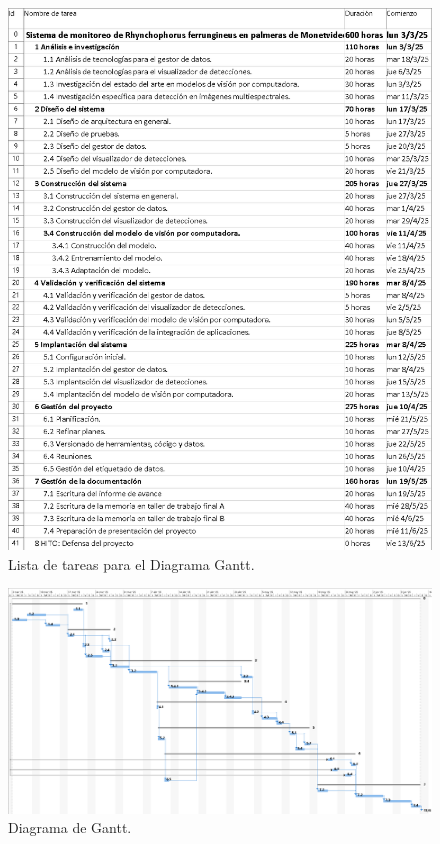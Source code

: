 \documentclass[
11pt, %
]{charter}
\begin{document}
\begin{figure}[htpb]
  \centering
  \includegraphics[height=.70\textheight]{./Figuras/lista-actividades.png}
  \caption{Lista de tareas para el Diagrama Gantt.}
  \label{fig:diagGanttAct}
\end{figure}

\begin{landscape}
  \centering
  \vspace*{\fill}
  \begin{figure}[htpb]
    \centering
    \includegraphics[height=.70\textheight]{./Figuras/gantt.jpg}
    \caption{Diagrama de Gantt.}
    \label{fig:diagGantt}
  \end{figure}
  \vfill
\end{landscape}
\end{document}

